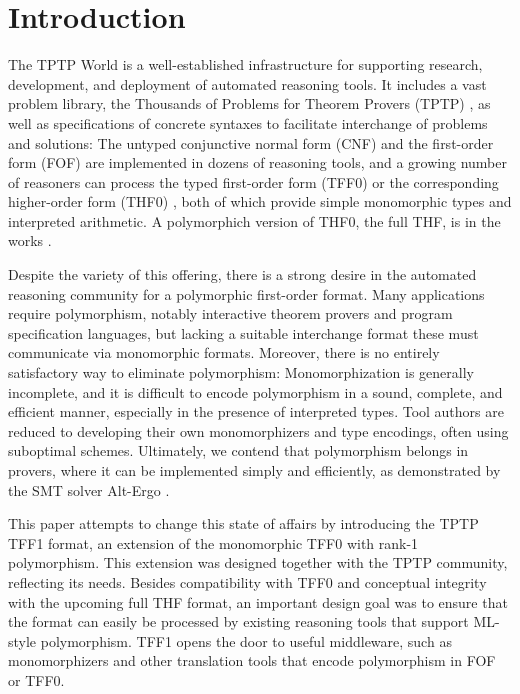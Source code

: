 \section{Introduction}
\label{sec_intro}

The TPTP World \cite{sutcliffe-2010-world} is a well-established infrastructure
for supporting research, development, and deployment of automated reasoning
tools. It includes a vast problem library, the Thousands of Problems for Theorem
Provers (TPTP) \cite{sutcliffe-2009-lib}, as well as specifications of concrete
syntaxes to facilitate interchange of problems and solutions: The untyped
conjunctive normal form (CNF) and the first-order form (FOF) are implemented in
dozens of reasoning tools, and a growing number of reasoners can process the
typed first-order form (TFF0) \cite{TFF0} or the corresponding higher-order form
(THF0) \cite{benzmueller-et-al-2008-thf0}, both of which provide simple
monomorphic types and interpreted arithmetic. A polymorphich version of THF0,
the full THF, is in the works \cite{sutcliffe-benzmueller-2010}.

Despite the variety of this offering, there is a strong desire in the automated
reasoning community for a polymorphic first-order format. Many applications
require polymorphism, notably interactive theorem provers and program
specification languages, but lacking a suitable interchange format these
must communicate via monomorphic formats. Moreover, there is no entirely
satisfactory way to eliminate polymorphism: Monomorphization is generally
incomplete, and it is difficult to encode polymorphism in a sound, complete, and
efficient manner, especially in the presence of interpreted types. Tool authors
are reduced to developing their own monomorphizers and type encodings, often
using suboptimal schemes. Ultimately, we contend that polymorphism belongs in
provers, where it can be implemented simply and efficiently, as demonstrated by
the SMT solver Alt-Ergo \cite{bobot-et-al-2008}.

This paper attempts to change this state of affairs by introducing the TPTP TFF1
format, an extension of the monomorphic TFF0 with rank-1 polymorphism. This
extension was designed together with the TPTP community, reflecting its needs.
Besides compatibility with TFF0 and conceptual integrity with the upcoming full
THF format, an important design goal was to ensure that the format can easily be
processed by existing reasoning tools that support ML-style polymorphism.
TFF1 opens the door to useful middleware, such as monomorphizers and other
translation tools that encode polymorphism in FOF or TFF0.

